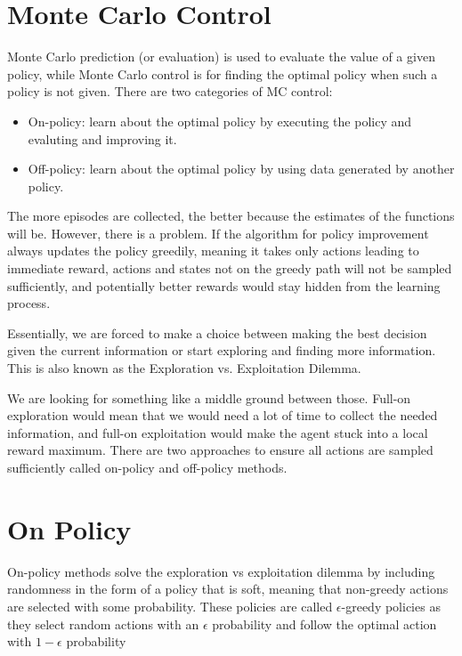 \section{Monte Carlo Control}
Monte Carlo prediction (or evaluation) is used to evaluate the value of a given policy, while Monte Carlo control is for finding the optimal policy when such a policy is not given. There are two categories of MC control:
\begin{itemize}
	\item On-policy: learn about the optimal policy by executing the policy and evaluting and improving it. 
	\item Off-policy: learn about the optimal policy by using data generated by another policy. 
\end{itemize}

The more episodes are collected, the better because the estimates of the functions will be. However, there is a problem. If the algorithm for policy improvement always updates the policy greedily, meaning it takes only actions leading to immediate reward, actions and states not on the greedy path will not be sampled sufficiently, and potentially better rewards would stay hidden from the learning process.

Essentially, we are forced to make a choice between making the best decision given the current information or start exploring and finding more information. This is also known as the Exploration vs. Exploitation Dilemma.

We are looking for something like a middle ground between those. Full-on exploration would mean that we would need a lot of time to collect the needed information, and full-on exploitation would make the agent stuck into a local reward maximum. There are two approaches to ensure all actions are sampled sufficiently called on-policy and off-policy methods.



\section{On Policy}
On-policy methods solve the exploration vs exploitation dilemma by including randomness in the form of a policy that is soft, meaning that non-greedy actions are selected with some probability. These policies are called $\epsilon$-greedy policies as they select random actions with an $\epsilon$ probability and follow the optimal action with $1-\epsilon$ probability

